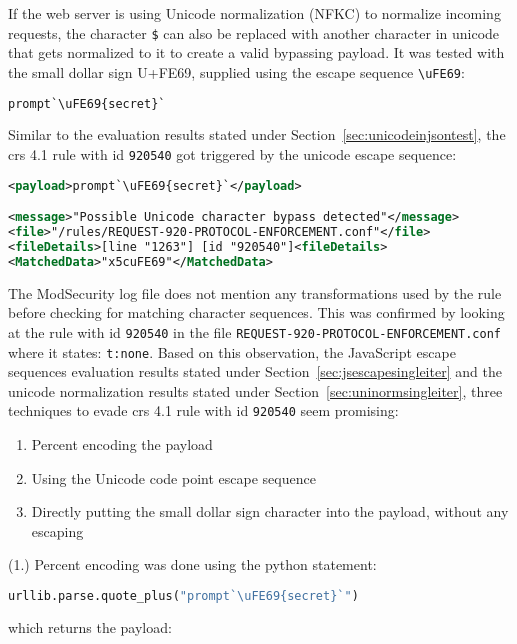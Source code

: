 If the web server is using Unicode normalization (NFKC) to normalize incoming requests, the character \verb|$| can also be replaced with another character in unicode that gets normalized to it to create a valid bypassing payload. It was tested with the small dollar sign U+FE69, supplied using the escape sequence \verb|\uFE69|:

\begin{lstlisting}[style=basicStyle, language=Python]
prompt`\uFE69{secret}`
\end{lstlisting}
Similar to the evaluation results stated under Section~\ref{sec:unicodeinjsontest}, the \acrshort{crs} 4.1 rule with id \verb|920540| got triggered by the unicode escape sequence:

\begin{lstlisting}[style=ruleStyle, language=XML]
<payload>prompt`\uFE69{secret}`</payload>

<message>"Possible Unicode character bypass detected"</message>
<file>"/rules/REQUEST-920-PROTOCOL-ENFORCEMENT.conf"</file>
<fileDetails>[line "1263"] [id "920540"]<fileDetails>
<MatchedData>"x5cuFE69"</MatchedData>
\end{lstlisting}
The ModSecurity log file does not mention any transformations used by the rule before checking for matching character sequences. This was confirmed by looking at the rule with id \verb|920540| in the file \verb|REQUEST-920-PROTOCOL-ENFORCEMENT.conf| where it states: \verb|t:none|. Based on this observation, the JavaScript escape sequences evaluation results stated under Section~\ref{sec:jsescapesingleiter} and the unicode normalization results stated under Section~\ref{sec:uninormsingleiter}, three techniques to evade \acrshort{crs} 4.1 rule with id \verb|920540| seem promising:

\begin{enumerate}
	\item Percent encoding the payload
	\item Using the Unicode code point escape sequence
	\item Directly putting the small dollar sign character into the payload, without any escaping
\end{enumerate}

(1.) Percent encoding was done using the python statement:

\begin{lstlisting}[style=basicStyle, language=Python]
urllib.parse.quote_plus("prompt`\uFE69{secret}`")
\end{lstlisting}
which returns the payload:

